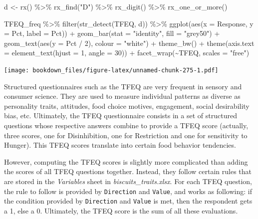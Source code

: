 \documentclass[
]{krantz}
\makeatletter
\newenvironment{Shaded}{\begin{snugshade}}{\end{snugshade}}
\newcommand{\AttributeTok}[1]{\textcolor[rgb]{0.61,0.61,0.61}{#1}}
\newcommand{\DecValTok}[1]{\textcolor[rgb]{0.06,0.06,0.06}{#1}}
\newcommand{\FunctionTok}[1]{\textcolor[rgb]{0,0,0}{#1}}
\newcommand{\NormalTok}[1]{#1}
\newcommand{\OtherTok}[1]{\textcolor[rgb]{0.37,0.37,0.37}{#1}}
\newcommand{\SpecialCharTok}[1]{\textcolor[rgb]{0,0,0}{#1}}
\newcommand{\StringTok}[1]{\textcolor[rgb]{0.5,0.5,0.5}{#1}}
\newenvironment{kframe}{%
\medskip{}
\setlength{\fboxsep}{.8em}
 \def\at@end@of@kframe{}%
 \ifinner\ifhmode%
  \def\at@end@of@kframe{\end{minipage}}%
  \begin{minipage}{\columnwidth}%
 \fi\fi%
 \def\FrameCommand##1{\hskip\@totalleftmargin \hskip-\fboxsep
 \colorbox{shadecolor}{##1}\hskip-\fboxsep
     \hskip-\linewidth \hskip-\@totalleftmargin \hskip\columnwidth}%
 \MakeFramed {\advance\hsize-\width
   \@totalleftmargin\z@ \linewidth\hsize
   \@setminipage}}%
 {\par\unskip\endMakeFramed%
 \at@end@of@kframe}
\renewenvironment{Shaded}{\begin{kframe}}{\end{kframe}}
\makeatother
\begin{document}
\begin{Shaded}
\begin{Highlighting}[]
\NormalTok{d }\OtherTok{\textless{}{-}} \FunctionTok{rx}\NormalTok{() }\SpecialCharTok{\%\textgreater{}\%}
  \FunctionTok{rx\_find}\NormalTok{(}\StringTok{"D"}\NormalTok{) }\SpecialCharTok{\%\textgreater{}\%}
  \FunctionTok{rx\_digit}\NormalTok{() }\SpecialCharTok{\%\textgreater{}\%}
  \FunctionTok{rx\_one\_or\_more}\NormalTok{()}

\NormalTok{TFEQ\_freq }\SpecialCharTok{\%\textgreater{}\%}
  \FunctionTok{filter}\NormalTok{(}\FunctionTok{str\_detect}\NormalTok{(TFEQ, d)) }\SpecialCharTok{\%\textgreater{}\%}
  \FunctionTok{ggplot}\NormalTok{(}\FunctionTok{aes}\NormalTok{(}\AttributeTok{x =}\NormalTok{ Response, }\AttributeTok{y =}\NormalTok{ Pct, }\AttributeTok{label =}\NormalTok{ Pct)) }\SpecialCharTok{+}
  \FunctionTok{geom\_bar}\NormalTok{(}\AttributeTok{stat =} \StringTok{"identity"}\NormalTok{, }\AttributeTok{fill =} \StringTok{"grey50"}\NormalTok{) }\SpecialCharTok{+}
  \FunctionTok{geom\_text}\NormalTok{(}\FunctionTok{aes}\NormalTok{(}\AttributeTok{y =}\NormalTok{ Pct }\SpecialCharTok{/} \DecValTok{2}\NormalTok{), }\AttributeTok{colour =} \StringTok{"white"}\NormalTok{) }\SpecialCharTok{+}
  \FunctionTok{theme\_bw}\NormalTok{() }\SpecialCharTok{+}
  \FunctionTok{theme}\NormalTok{(}\AttributeTok{axis.text =} \FunctionTok{element\_text}\NormalTok{(}\AttributeTok{hjust =} \DecValTok{1}\NormalTok{, }\AttributeTok{angle =} \DecValTok{30}\NormalTok{)) }\SpecialCharTok{+}
  \FunctionTok{facet\_wrap}\NormalTok{(}\SpecialCharTok{\textasciitilde{}}\NormalTok{TFEQ, }\AttributeTok{scales =} \StringTok{"free"}\NormalTok{)}
\end{Highlighting}
\end{Shaded}

\texttt{[image: bookdown\_files/figure-latex/unnamed-chunk-275-1.pdf]}

Structured questionnaires such as the TFEQ are very frequent in sensory and consumer science. They are used to measure individual patterns as diverse as personality traits, attitudes, food choice motives, engagement, social desirability bias, etc. Ultimately, the TFEQ questionnaire consists in a set of structured questions whose respective answers combine to provide a TFEQ score (actually, three scores, one for Disinhibition, one for Restriction and one for sensitivity to Hunger). This TFEQ scores translate into certain food behavior tendencies.

However, computing the TFEQ scores is slightly more complicated than adding the scores of all TFEQ questions together. Instead, they follow certain rules that are stored in the \emph{Variables} sheet in \emph{biscuits\_traits.xlsx}. For each TFEQ question, the rule to follow is provided by \texttt{Direction} and \texttt{Value}, and works as following: if the condition provided by \texttt{Direction} and \texttt{Value} is met, then the respondent gets a 1, else a 0. Ultimately, the TFEQ score is the sum of all these evaluations.
\end{document}
